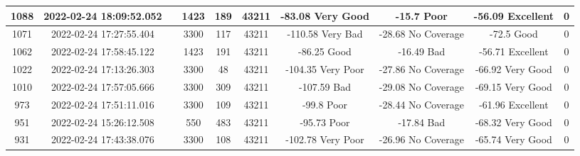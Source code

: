 \begin{longtable*}{|c|c|c|c|c|c|c|c|c|c|}
1088&2022-02-24 18:09:52.052&&1423&189&43211& -83.08    Very Good   & -15.7     Poor        & -56.09    Excellent   & 0\\\hline
{}1071&2022-02-24 17:27:55.404&&3300&117&43211& -110.58   Very Bad    & -28.68    No Coverage & -72.5     Good        & 0\\\hline
{}1062&2022-02-24 17:58:45.122&&1423&191&43211& -86.25    Good        & -16.49    Bad         & -56.71    Excellent   & 0\\\hline
{}1022&2022-02-24 17:13:26.303&&3300&48&43211& -104.35   Very Poor   & -27.86    No Coverage & -66.92    Very Good   & 0\\\hline
{}1010&2022-02-24 17:57:05.666&&3300&309&43211& -107.59   Bad         & -29.08    No Coverage & -69.15    Very Good   & 0\\\hline
{}973&2022-02-24 17:51:11.016&&3300&109&43211& -99.8     Poor        & -28.44    No Coverage & -61.96    Excellent   & 0\\\hline
{}951&2022-02-24 15:26:12.508&&550&483&43211& -95.73    Poor        & -17.84    Bad         & -68.32    Very Good   & 0\\\hline
{}931&2022-02-24 17:43:38.076&&3300&108&43211& -102.78   Very Poor   & -26.96    No Coverage & -65.74    Very Good   & 0\\\hline

\end{longtable*}
